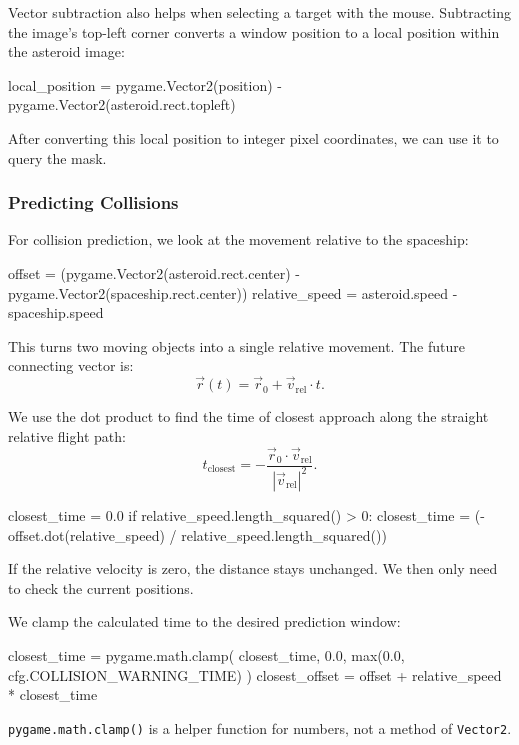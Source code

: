 Vector subtraction also helps when selecting a target with the mouse. Subtracting the image's top-left corner converts a window position to a local position within the asteroid image:
\begin{codebox}
local_position = pygame.Vector2(position) - pygame.Vector2(asteroid.rect.topleft)
\end{codebox}

After converting this local position to integer pixel coordinates, we can use it to query the mask.

\subsubsection*{Predicting Collisions}

For collision prediction, we look at the movement relative to the spaceship:
\begin{codebox}
offset = (pygame.Vector2(asteroid.rect.center) - pygame.Vector2(spaceship.rect.center))
relative_speed = asteroid.speed - spaceship.speed
\end{codebox}

This turns two moving objects into a single relative movement. The future connecting vector is:
\[
\vec r(t)
=
\vec r_0
+
\vec v_{\mathrm{rel}} \cdot t.
\]

We use the dot product to find the time of closest approach along the straight relative flight path:
\[
t_{\mathrm{closest}}
=
-\frac{
	\vec r_0 \cdot \vec v_{\mathrm{rel}}
}{
	|\vec v_{\mathrm{rel}}|^2
}.
\]

\begin{codebox}
closest_time = 0.0
if relative_speed.length_squared() > 0:
    closest_time = (-offset.dot(relative_speed)	/ relative_speed.length_squared())
\end{codebox}

If the relative velocity is zero, the distance stays unchanged. We then only need to check the current positions.

We clamp the calculated time to the desired prediction window:
\begin{codebox}
closest_time = pygame.math.clamp(
    closest_time,
    0.0,
    max(0.0, cfg.COLLISION_WARNING_TIME)
)
closest_offset = offset + relative_speed * closest_time
\end{codebox}

\texttt{pygame.math.clamp()} is a helper function for numbers, not a method of \texttt{Vector2}.

